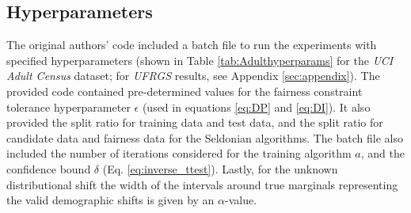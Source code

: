 



\subsection{Hyperparameters}
The original authors' code included a batch file to run the experiments with specified hyperparameters (shown in Table \ref{tab:Adulthyperparams} for the \textit{UCI Adult Census} dataset; for \textit{UFRGS} results, see Appendix \ref{sec:appendix}). The provided code contained pre-determined values for the fairness constraint tolerance hyperparameter $\epsilon$ (used in equations \ref{eq:DP} and \ref{eq:DI}). It also provided the split ratio for training data and test data, and the split ratio for candidate data and fairness data for the Seldonian algorithms. The batch file also included the number of iterations considered for the training algorithm $a$, and the confidence bound $\delta$ (Eq. \ref{eq:inverse_ttest}). Lastly, for the unknown distributional shift the width of the intervals around true marginals representing the valid demographic shifts is given by an $\alpha$-value. 

